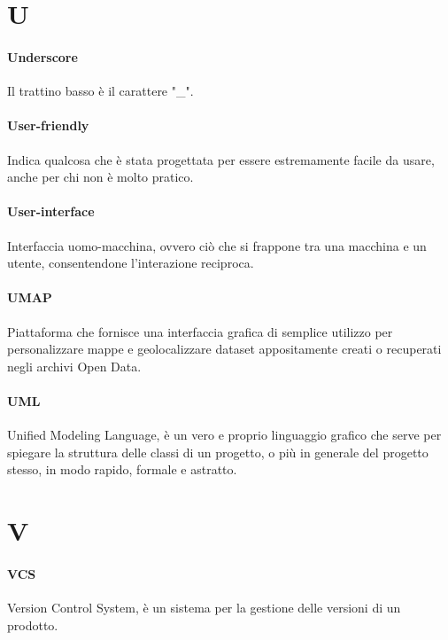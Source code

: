 \documentclass[]{article}
\begin{document}
	\section*{U}

	\paragraph*{Underscore}
	Il trattino basso è il carattere "\_".

	\paragraph*{User-friendly}
	Indica qualcosa che è stata progettata per essere estremamente facile da usare, anche per chi non è molto pratico.

	\paragraph*{User-interface}
	Interfaccia uomo-macchina, ovvero ciò che si frappone tra una macchina e un utente, consentendone l'interazione reciproca.

	\paragraph*{UMAP}
	Piattaforma che fornisce una interfaccia grafica di semplice utilizzo per personalizzare mappe e geolocalizzare dataset appositamente creati o recuperati negli archivi Open Data.

	\paragraph*{UML}
	Unified Modeling Language, è un vero e proprio linguaggio grafico che serve per spiegare la struttura delle classi di un progetto, o più in generale del progetto stesso, in modo rapido, formale e astratto.

	\newpage

	\section*{V}

	\paragraph*{VCS}
	Version Control System, è un sistema per la gestione delle versioni di un prodotto.
\end{document}
